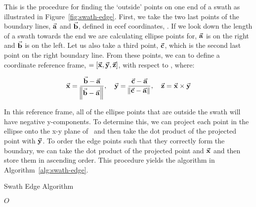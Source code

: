 This is the procedure for finding the `outside' points on one end of a swath as
illustrated in Figure~\ref{fig:swath-edge}. First, we take the two last points
of the boundary lines, $\vec{\bm{\mathrm{a}}}$ and $\vec{\bm{\mathrm{b}}}$, defined in \gls{ecef}
coordinates, \Fe. If we look down the length of a swath towards the end we are
calculating ellipse points for, $\vec{\bm{\mathrm{a}}}$ is on the right and $\vec{\bm{\mathrm{b}}}$ is on
the left.  Let us also take a third point, $\vec{\bm{\mathrm{c}}}$, which is the second last
point on the right boundary line.  From these points, we can to define a
coordinate reference frame, \Fs $= [\vec{\bm{\mathrm{x}}}, \vec{\bm{\mathrm{y}}}, \vec{\bm{\mathrm{z}}}]$, with respect
to \Fe, where:

\begin{equation}
    \vec{\bm{\mathrm{x}}} = \frac{\vec{\bm{\mathrm{b}}}-\vec{\bm{\mathrm{a}}}}{\norm{\vec{\bm{\mathrm{b}}} - \vec{\bm{\mathrm{a}}}}}
    , \quad
    \vec{\bm{\mathrm{y}}} = \frac{\vec{\bm{\mathrm{c}}}-\vec{\bm{\mathrm{a}}}}{\norm{\vec{\bm{\mathrm{c}}} - \vec{\bm{\mathrm{a}}}}}
    , \quad
    \vec{\bm{\mathrm{z}}} = \vec{\bm{\mathrm{x}}} \times \vec{\bm{\mathrm{y}}}
\end{equation}

In this reference frame, all of the ellipse points that are outside the swath
will have negative y-components. To determine this, we can project each point
in the ellipse onto the x-y plane of \Fs~and then take the dot product of the
projected point with $\vec{\bm{\mathrm{y}}}$. To order the edge points such that they
correctly form the boundary, we can take the dot product of the projected point
and $\vec{\bm{\mathrm{x}}}$ and then store them in ascending order. This procedure yields
the algorithm in Algorithm~\ref{alg:swath-edge}.


\begin{algorithm}
    \caption{Swath Edge Algorithm} 
    \label{alg:swath-edge}
    \begin{algorithmic}[1] 
		
		
		


	    \EndIf
	\EndFor
	\State \Return $O$
	\EndFunction
    \end{algorithmic} 
\end{algorithm}


